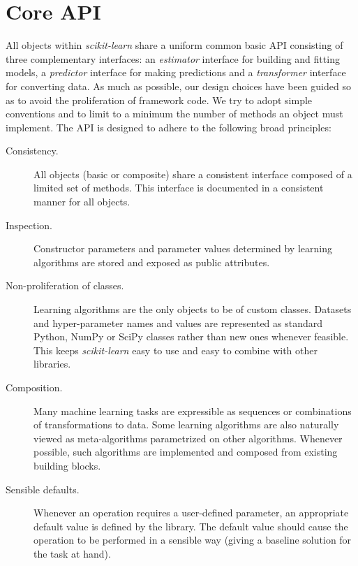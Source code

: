 \documentclass{llncs}
\newcommand{\sklearn}{\textit{scikit-learn}\xspace}
\begin{document}
\section{Core API}

\label{sec:core-api}

All objects within \sklearn share a uniform common basic API consisting of three
complementary interfaces: an \textit{estimator} interface for building and
fitting models, a \textit{predictor} interface for making predictions and a
\textit{transformer} interface for converting data. As much as possible, our
design choices have been guided so as to avoid the proliferation of framework
code. We try to adopt simple conventions and to limit to a minimum the number of
methods an object must implement. The API is designed to adhere to the following
broad principles:

\begin{description}
  \item[Consistency.]
       All objects (basic or composite) share a consistent interface composed of
       a limited set of methods. This interface is documented in a consistent
       manner for all objects.
  \item[Inspection.]
       Constructor parameters and parameter values determined by learning
       algorithms are stored and exposed as public attributes.
  \item[Non-proliferation of classes.]
       Learning algorithms are the only objects to be of custom classes.
       Datasets and hyper-parameter names and values are represented as standard
       Python, NumPy or SciPy classes rather than new ones whenever feasible.
       This keeps \sklearn easy to use and easy to combine with other libraries.
  \item[Composition.]
       Many machine learning tasks are expressible
       as sequences or combinations of transformations to data.
       Some learning algorithms are also naturally viewed
       as meta-algorithms parametrized on other algorithms.
       Whenever possible, such algorithms are implemented and composed from
       existing building blocks.
  \item[Sensible defaults.]
       Whenever an operation requires a user-defined parameter,
       an appropriate default value is defined by the library.
       The default value should cause the operation to be performed
       in a sensible way (giving a baseline solution for the task at hand).
\end{description}
\end{document}

